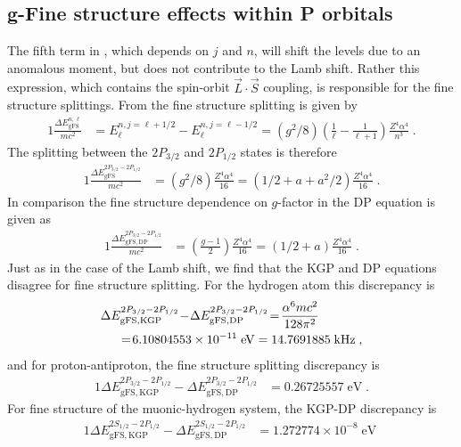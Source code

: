 \subsection{g-Fine structure effects within P orbitals} \label{fs}
The fifth term in , which depends on $j$ and $n$, will shift the levels due to an anomalous moment, but does not contribute to the Lamb shift. Rather this expression, which contains the spin-orbit $\vec{L}\cdot\vec{S}$ coupling, is responsible for the fine structure splittings. From  the fine structure splitting is given by
\begin{alignat}{1}
\label{fs00} \frac{\Delta E_{\mathrm{gFS}}^{n,\ell}}{mc^{2}}&=E^{n,j=\ell+1/2}_{\ell}-E^{n,j=\ell-1/2}_{\ell}=\left(g^{2}/8\right)\left(\frac{1}{\ell}-\frac{1}{\ell+1}\right)\frac{Z^{4}\alpha^{4}}{n^{3}}\;.
\end{alignat}
The splitting between the $2P_{3/2}$ and $2P_{1/2}$ states is therefore
\begin{alignat}{1}
\label{fs01} \frac{\Delta E_{\mathrm{gFS}}^{2P_{3/2}-2P_{1/2}}}{mc^{2}}&=\left(g^{2}/8\right)\frac{Z^{4}\alpha^{4}}{16}=\left(1/2+a+a^{2}/2\right)\frac{Z^{4}\alpha^{4}}{16}\;.
\end{alignat}
In comparison the fine structure dependence on $g$-factor in the DP equation is given as
\begin{alignat}{1}
\label{fs02} \frac{\Delta E_{\mathrm{gFS,DP}}^{2P_{3/2}-2P_{1/2}}}{mc^{2}}&=\left(\frac{g-1}{2}\right)\frac{Z^{4}\alpha^{4}}{16}=\left(1/2+a\right)\frac{Z^{4}\alpha^{4}}{16}\;.
\end{alignat}
Just as in the case of the Lamb shift, we find that the KGP and DP equations disagree for fine structure splitting. For the hydrogen atom this discrepancy is 
\begin{alignat}{1}
\label{fs03} \Delta &E_{\mathrm{gFS,KGP}}^{2P_{3/2}-2P_{1/2}}\!-\!\Delta E_{\mathrm{gFS,DP}}^{2P_{3/2}-2P_{1/2}}\!=\!\frac{\alpha^{6}mc^{2}}{128\pi^{2}}\\ \notag&\;\;=\!6.10804553\times10^{-11}\;\mathrm{eV}=14.7691885\;\mathrm{kHz}\;,\end{alignat}
and for proton-antiproton, the fine structure splitting discrepancy is
\begin{alignat}{1}
\label{fs04} \Delta E_{\mathrm{gFS,KGP}}^{2P_{3/2}-2P_{1/2}}-\Delta E_{\mathrm{gFS,DP}}^{2P_{3/2}-2P_{1/2}}&=0.26725557\;\mathrm{eV}\;.
\end{alignat}
For fine structure of the muonic-hydrogen system, the KGP-DP discrepancy is
\begin{alignat}{1}
\label{fs05} \Delta E_{\mathrm{gFS,KGP}}^{2S_{1/2}-2P_{1/2}}-\Delta E_{\mathrm{gFS,DP}}^{2S_{1/2}-2P_{1/2}}&=\!1.272774\times10^{-8}\;\mathrm{eV}\;
\end{alignat} 
